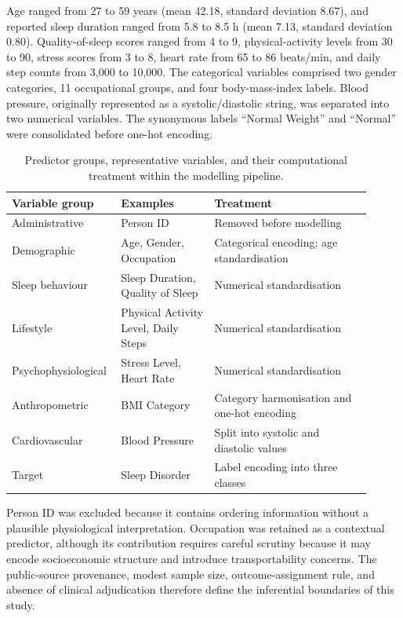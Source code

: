 \documentclass[a4paper,fleqn]{cas-dc}
\begin{document}
Age ranged from 27 to 59 years (mean 42.18, standard deviation 8.67), and reported sleep duration ranged from 5.8 to 8.5 h (mean 7.13, standard deviation 0.80). Quality-of-sleep scores ranged from 4 to 9, physical-activity levels from 30 to 90, stress scores from 3 to 8, heart rate from 65 to 86 beats/min, and daily step counts from 3,000 to 10,000. The categorical variables comprised two gender categories, 11 occupational groups, and four body-mass-index labels. Blood pressure, originally represented as a systolic/diastolic string, was separated into two numerical variables. The synonymous labels ``Normal Weight'' and ``Normal'' were consolidated before one-hot encoding.

\begin{table}[width=\textwidth,pos=!tbp]
\centering
\caption{Predictor groups, representative variables, and their computational treatment within the modelling pipeline.}
\label{tab:variables}
\small
\begin{tabular}{Q{0.24\linewidth}Q{0.25\linewidth}Q{0.42\linewidth}}
\toprule
Variable group & Examples & Treatment \\
\midrule
Administrative & Person ID & Removed before modelling \\
Demographic & Age, Gender, Occupation & Categorical encoding; age standardisation \\
Sleep behaviour & Sleep Duration, Quality of Sleep & Numerical standardisation \\
Lifestyle & Physical Activity Level, Daily Steps & Numerical standardisation \\
Psychophysiological & Stress Level, Heart Rate & Numerical standardisation \\
Anthropometric & BMI Category & Category harmonisation and one-hot encoding \\
Cardiovascular & Blood Pressure & Split into systolic and diastolic values \\
Target & Sleep Disorder & Label encoding into three classes \\
\bottomrule
\end{tabular}
\end{table}

Person ID was excluded because it contains ordering information without a plausible physiological interpretation. Occupation was retained as a contextual predictor, although its contribution requires careful scrutiny because it may encode socioeconomic structure and introduce transportability concerns. The public-source provenance, modest sample size, outcome-assignment rule, and absence of clinical adjudication therefore define the inferential boundaries of this study.
\end{document}
